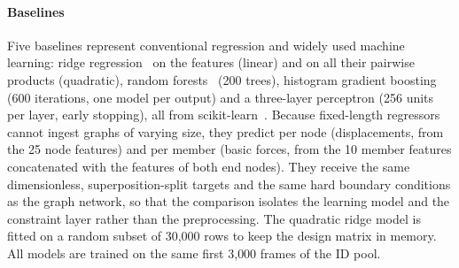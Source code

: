 \paragraph{Baselines} Five baselines represent conventional regression and widely used machine learning: ridge regression~\cite{hoerl1970ridge} on the features (linear) and on all their pairwise products (quadratic), random forests~\cite{breiman2001rf} (200 trees), histogram gradient boosting~\cite{friedman2001gbm} (600 iterations, one model per output) and a three-layer perceptron (256 units per layer, early stopping), all from scikit-learn~\cite{pedregosa2011sklearn}. Because fixed-length regressors cannot ingest graphs of varying size, they predict per node (displacements, from the 25 node features) and per member (basic forces, from the 10 member features concatenated with the features of both end nodes). They receive the same dimensionless, superposition-split targets and the same hard boundary conditions as the graph network, so that the comparison isolates the learning model and the constraint layer rather than the preprocessing. The quadratic ridge model is fitted on a random subset of 30{,}000 rows to keep the design matrix in memory. All models are trained on the same first 3{,}000 frames of the ID pool.

